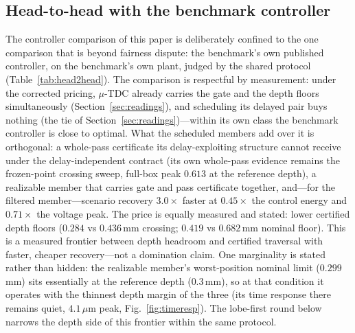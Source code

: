 \documentclass[preprint,12pt]{elsarticle}
\begin{document}
\subsection*{Head-to-head with the benchmark controller}

The controller comparison of this paper is deliberately confined to
the one comparison that is beyond fairness dispute: the benchmark's
own published controller, on the benchmark's own plant, judged by the
shared protocol (Table~\ref{tab:head2head}).  The comparison is
respectful by measurement: under the corrected pricing, $\mu$-TDC
already carries the gate and the depth floors simultaneously
(Section~\ref{sec:readings}), and scheduling its delayed pair buys
nothing (the tie of Section~\ref{sec:readings})---within its own
class the benchmark controller is close to optimal.  What the
scheduled members add over it is orthogonal: a whole-pass certificate
its delay-exploiting structure cannot receive under the
delay-independent contract (its own whole-pass evidence remains the
frozen-point crossing sweep, full-box peak $0.613$ at the reference
depth), a realizable member that carries gate and pass certificate
together, and---for the filtered member---scenario recovery
$3.0\times$ faster at $0.45\times$ the control energy and
$0.71\times$ the voltage peak.  The price is equally measured and
stated: lower certified depth floors ($0.284$ vs $0.436$\,mm
crossing; $0.419$ vs $0.682$\,mm nominal floor).  This is a measured
frontier between depth headroom and certified traversal with faster,
cheaper recovery---not a domination claim.
One marginality is stated rather than hidden: the realizable
member's worst-position nominal limit ($0.299$\,mm) sits essentially
at the reference depth ($0.3$\,mm), so at that condition it operates
with the thinnest depth margin of the three (its time response there
remains quiet, $4.1\,\mu$m peak, Fig.~\ref{fig:timeresp}).
The lobe-first round below narrows the depth side of this frontier
within the same protocol.
\end{document}
